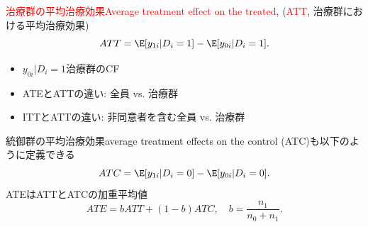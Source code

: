 \begin{frame}{}
\textcolor{red}{治療群の平均治療効果Average treatment effect on the treated}, (\textcolor{red}{ATT}, 治療群における平均治療効果)
\[
ATT = \E[y_{1i}|D_{i}=1]-\E[y_{0i}|D_{i}=1].
\]
\pause
\begin{itemize}
\vspace{0.0ex}\setlength{\itemsep}{1.0ex}\setlength{\baselineskip}{12pt}
\item	$y_{0i}|D_{i}=1$治療群のCF
\pause
\item	ATEとATTの違い:  全員 vs. 治療群
\pause	
\item	ITTとATTの違い: 非同意者を含む全員 vs. 治療群
\end{itemize}

\vspace{1ex}
\pause
統御群の平均治療効果average treatment effects on the control (ATC)も以下のように定義できる
\[
ATC = \E[y_{1i}|D_{i}=0]-\E[y_{0i}|D_{i}=0].
\]
\pause
ATEはATTとATCの加重平均値
\[
ATE = b ATT + (1-b) ATC, \quad b= \frac{n_{1}}{n_{0}+n_{1}}.
\]
\end{frame}

